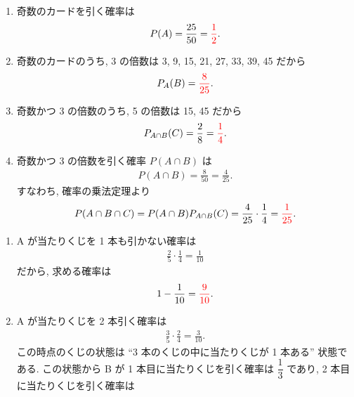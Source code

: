 \vspace{\baselineskip}
\check
\begin{qenumerate}
	\item{
		\begin{enumerate}
			\item{
				奇数のカードを引く確率は
				\begin{align}
					P(A) = \frac{25}{50} = \textcolor{red}{\frac{1}{2}}.
				\end{align}
			}
			\item{
				奇数のカードのうち, 3 の倍数は 3, 9, 15, 21, 27, 33, 39, 45 だから
				\begin{align}
					P_{A}(B) = \textcolor{red}{\frac{8}{25}}.
				\end{align}
			}
			\item{
				奇数かつ 3 の倍数のうち, 5 の倍数は 15, 45 だから
				\begin{align}
					P_{A\cap B}(C) = \frac{2}{8} = \textcolor{red}{\frac{1}{4}}.
				\end{align}
			}
			\item{
				奇数かつ 3 の倍数を引く確率 $P(A\cap B)$ は
				\begin{align}
					P(A\cap B) = \frac{8}{50} = \frac{4}{25}.
				\end{align}
				すなわち, 確率の乗法定理より
				\begin{align}
					P(A\cap B\cap C) = P(A\cap B)P_{A\cap B}(C) = \frac{4}{25}\cdot\frac{1}{4} = \textcolor{red}{\frac{1}{25}}.
				\end{align}
			}
		\end{enumerate}
	}
	\item{
		\begin{enumerate}
			\item{
				A が当たりくじを 1 本も引かない確率は
				\begin{align}
					\frac{2}{5}\cdot\frac{1}{4} = \frac{1}{10}
				\end{align}
				だから, 求める確率は
				\begin{align}
					1 - \frac{1}{10} = \textcolor{red}{\frac{9}{10}}.
				\end{align}
			}
			\item{
				A が当たりくじを 2 本引く確率は
				\begin{align}
					\frac{3}{5}\cdot\frac{2}{4} = \frac{3}{10}.
				\end{align}
				この時点のくじの状態は ``3 本のくじの中に当たりくじが 1 本ある'' 状態である.
				この状態から B が 1 本目に当たりくじを引く確率は $\dfrac{1}{3}$ であり, 2 本目に当たりくじを引く確率は
				\begin{align}

\end{align}}
\end{enumerate}}
\end{qenumerate}
